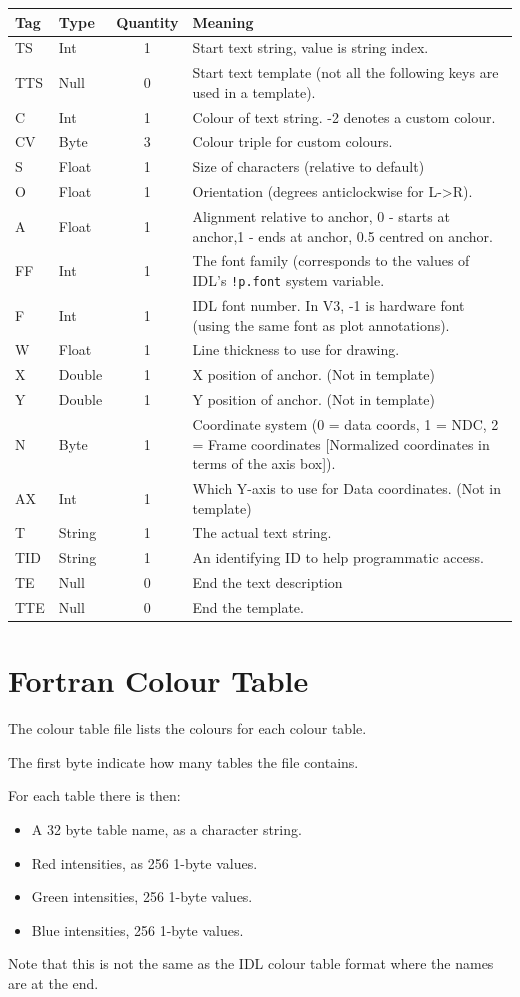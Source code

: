 \documentclass[english]{article}
\begin{document}
\begin{longtable}{|llcp{8cm}|}
\hline 
Tag&
Type&
Quantity&
Meaning\\
\hline
\endhead
\hline
\endfoot
TS& Int& 1&
Start text string, value is string index.\\
TTS& Null& 0&
Start text template (not all the following keys are used in a template).\\
\hline 
C& Int& 1&
Colour of text string. -2 denotes a custom colour.\\
CV & Byte & 3 &
Colour triple for custom colours.\\
S& Float& 1&
Size of characters (relative to default)\\
O& Float& 1&
Orientation (degrees anticlockwise for L->R).\\
A& Float& 1& Alignment relative to anchor, 0 - starts at anchor,1 -
ends at anchor,
0.5 centred on anchor.\\
FF & Int & 1 & The font family (corresponds to the values of IDL's
\texttt{!p.font} system variable.\\
F& Int& 1&
IDL font number. In V3, -1 is hardware font (using the same font as
plot annotations).\\
W& Float& 1&
Line thickness to use for drawing.\\
X& Double& 1&
X position of anchor. (Not in template)\\
Y& Double& 1&
Y position of anchor. (Not in template)\\
N& Byte& 1& Coordinate system (0 = data coords, 1 = NDC, 2 = Frame coordinates
[Normalized coordinates in terms of the axis box]).\\
AX & Int & 1 & Which Y-axis to use for Data coordinates. (Not in template)\\
T& String& 1&
The actual text string.\\
TID & String & 1 & An identifying ID to help programmatic access.\\
\hline TE& Null& 0&
End the text description\\
TTE& Null& 0&
End the template.\\
\end{longtable}

\section{Fortran Colour Table}
\label{sec:colour_table}

The colour table file lists the colours for each colour table. 

The first byte indicate how many tables the file contains.

For each table there is then:
\begin{itemize}
\item A 32 byte table name, as a character string.
\item Red intensities, as 256 1-byte values.
\item Green intensities, 256 1-byte values.
\item Blue intensities, 256 1-byte values.
\end{itemize}

Note that this is not the same as the IDL colour table format where the
names are at the end.
\end{document}
